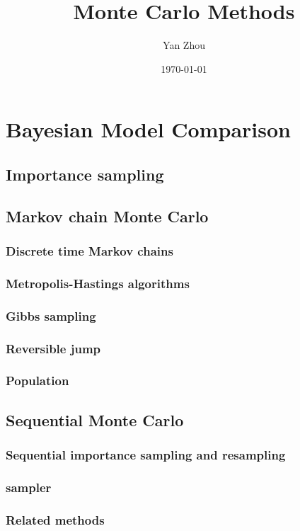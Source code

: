 \documentclass[11pt, hyper, bib, fontset=Minion]{marticle}
\title{Monte Carlo Methods}
\author{Yan Zhou}
\date{\today}
\begin{document}
\maketitle

\else %

\chapter{Bayesian Model Comparison}
\label{cha:Bayesian Model Comparison}

\fi %

\section{Importance sampling}
\label{sec:Importance sampling}

\section{Markov chain Monte Carlo}
\label{sec:Markov chain Monte Carlo}

\subsection{Discrete time Markov chains}
\label{sub:Discrete time Markov chains}

\subsection{Metropolis-Hastings algorithms}
\label{sub:Metropolis-Hastings algorithms}

\subsection{Gibbs sampling}
\label{sub:Gibbs sampling}

\subsection{Reversible jump \protect\mcmc}
\label{sub:Reversible jump mcmc}

\subsection{Population \protect\mcmc}
\label{sub:Population mcmc}

\section{Sequential Monte Carlo}
\label{sec:Sequential Monte Carlo}

\subsection{Sequential importance sampling and resampling}
\label{sub:Sequential importance sampling and resampling}

\subsection{\protect\smc sampler}
\label{sub:smc sampler}

\subsection{Related methods}
\label{sub:Related methods}

\ifx\inthesis\undefined
\printbibliography
\end{document}
